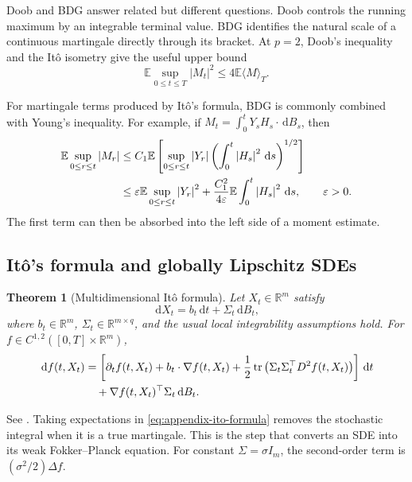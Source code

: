 \documentclass[11pt]{amsart}
\numberwithin{equation}{section}
\theoremstyle{plain}
\newtheorem{theorem}{Theorem}[section]
\newcommand{\R}{\mathbb{R}}
\newcommand{\E}{\mathbb{E}}
\newcommand{\dd}{\,\mathrm{d}}
\newcommand{\abs}[1]{\left\lvert#1\right\rvert}
\begin{document}
Doob and BDG answer related but different questions.  Doob controls the
running maximum by an integrable terminal value.  BDG identifies the natural
scale of a continuous martingale directly through its bracket.  At $p=2$,
Doob's inequality and the It\^o isometry give the useful upper bound
\begin{equation}\label{eq:appendix-doob-isometry}
 \E\sup_{0\leq t\leq T}\abs{M_t}^2
 \leq4\E\langle M\rangle_T.
\end{equation}

For martingale terms produced by It\^o's formula, BDG is commonly combined
with Young's inequality.  For example, if
$M_t=\int_0^tY_sH_s\cdot\dd B_s$, then
\begin{align}
 \E\sup_{0\leq r\leq t}\abs{M_r}
 &\leq C_1\E\left[
 \sup_{0\leq r\leq t}\abs{Y_r}
 \left(\int_0^t\abs{H_s}^2\dd s\right)^{1/2}\right]\notag\\
 &\leq\varepsilon\E\sup_{0\leq r\leq t}\abs{Y_r}^2
 +\frac{C_1^2}{4\varepsilon}
 \E\int_0^t\abs{H_s}^2\dd s,
 \qquad\varepsilon>0.\label{eq:appendix-bdg-young}
\end{align}
The first term can then be absorbed into the left side of a moment estimate.

\subsection{It\^o's formula and globally Lipschitz SDEs}

\begin{theorem}[Multidimensional It\^o formula]
\label{thm:appendix-ito-formula}
Let $X_t\in\R^m$ satisfy
\begin{equation}\label{eq:appendix-sde-general}
 \dd X_t=b_t\dd t+\Sigma_t\dd B_t,
\end{equation}
where $b_t\in\R^m$, $\Sigma_t\in\R^{m\times q}$, and the usual local
integrability assumptions hold.  For $f\in C^{1,2}([0,T]\times\R^m)$,
\begin{align}
 \dd f(t,X_t)
 &=\left[\partial_tf(t,X_t)+b_t\cdot\nabla f(t,X_t)
 +\frac12\operatorname{tr}\left(
 \Sigma_t\Sigma_t^\top D^2f(t,X_t)\right)\right]\dd t\notag\\
 &\quad+\nabla f(t,X_t)^\top\Sigma_t\dd B_t.
 \label{eq:appendix-ito-formula}
\end{align}
\end{theorem}
See \cite[Chapter~3, Section~3]{KaratzasShreve1991}.  Taking expectations in
\eqref{eq:appendix-ito-formula} removes the stochastic integral when it is a
true martingale.  This is the step that converts an SDE into its weak
Fokker--Planck equation.  For constant
$\Sigma=\sigma I_m$, the second-order term is
$(\sigma^2/2)\Delta f$.
\end{document}
